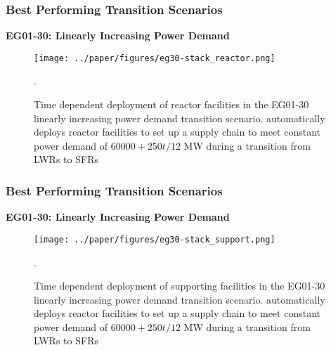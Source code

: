 \begin{frame}
    \frametitle{Best Performing Transition Scenarios}
    \textbf{EG01-30: Linearly Increasing Power Demand}
    \begin{figure}[htbp!]
        \begin{center}
          \texttt{[image: ../paper/figures/eg30-stack\_reactor.png]}
        \end{center}
              \caption{Time dependent deployment of reactor facilities in 
              the EG01-30 linearly increasing power demand transition scenario. 
              \deploy automatically deploys reactor facilities 
              to set up a supply chain to meet constant power demand of $60000+250t/12$ MW
              during a transition from \glspl{LWR} to \glspl{SFR}}.
      \end{figure}
\end{frame}

\begin{frame}
    \frametitle{Best Performing Transition Scenarios}
    \textbf{EG01-30: Linearly Increasing Power Demand}
    \begin{figure}[htbp!]
        \begin{center}
          \texttt{[image: ../paper/figures/eg30-stack\_support.png]}
        \end{center}
              \caption{Time dependent deployment of supporting facilities in 
              the EG01-30 linearly increasing power demand transition scenario. 
              \deploy automatically deploys reactor facilities 
              to set up a supply chain to meet constant power demand of $60000+250t/12$ MW
              during a transition from \glspl{LWR} to \glspl{SFR}}.
      \end{figure}
\end{frame}

